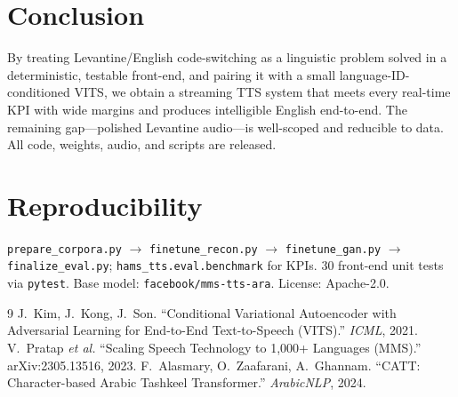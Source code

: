 \documentclass[10pt,twocolumn]{article}
\begin{document}
\section{Conclusion}
By treating Levantine/English code-switching as a linguistic problem solved in a
deterministic, testable front-end, and pairing it with a small language-ID-conditioned
VITS, we obtain a streaming TTS system that meets every real-time KPI with wide margins
and produces intelligible English end-to-end. The remaining gap---polished Levantine
audio---is well-scoped and reducible to data. All code, weights, audio, and scripts are
released.

{\small
\section*{Reproducibility}
\texttt{prepare\_corpora.py} $\rightarrow$ \texttt{finetune\_recon.py} $\rightarrow$
\texttt{finetune\_gan.py} $\rightarrow$ \texttt{finalize\_eval.py};
\texttt{hams\_tts.eval.benchmark} for KPIs. 30 front-end unit tests via \texttt{pytest}.
Base model: \texttt{facebook/mms-tts-ara}. License: Apache-2.0.
}

{\small
\begin{thebibliography}{9}
 J.~Kim, J.~Kong, J.~Son. ``Conditional Variational Autoencoder with
Adversarial Learning for End-to-End Text-to-Speech (VITS).'' \emph{ICML}, 2021.
 V.~Pratap \emph{et al.} ``Scaling Speech Technology to 1,000+
Languages (MMS).'' arXiv:2305.13516, 2023.
 F.~Alasmary, O.~Zaafarani, A.~Ghannam. ``CATT: Character-based Arabic
Tashkeel Transformer.'' \emph{ArabicNLP}, 2024.
\end{thebibliography}
}
\end{document}
